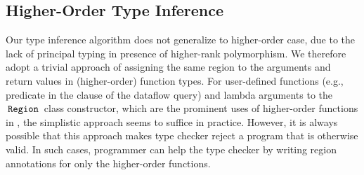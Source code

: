 
\subsection{Higher-Order Type Inference}

Our type inference algorithm does not generalize to higher-order case,
due to the lack of principal typing in presence of higher-rank
polymorphism. We therefore adopt a trivial approach of assigning the
same region to the arguments and return values in (higher-order)
function types. For user-defined functions (e.g., predicate in the
 clause of the  dataflow query) and lambda
arguments to the $\,{\tt Region}\,$ class constructor, which are the prominent
uses of higher-order functions in \name, the simplistic approach seems
to suffice in practice. However, it is always possible that this
approach makes type checker reject a program that is otherwise valid.
In such cases, programmer can help the type checker by writing region
annotations for only the higher-order functions.

